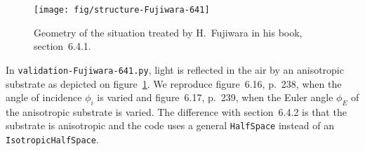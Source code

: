 \begin{figure}[b]
\texttt{[image: fig/structure-Fujiwara-641]}
\caption{\label{fig:situation641}Geometry of the situation treated by H.~Fujiwara in his book, section~6.4.1.}
\end{figure}

In \verb/validation-Fujiwara-641.py/, light is reflected in the air by an anisotropic substrate as depicted on figure~\ref{fig:situation641}.
We reproduce figure~6.16, p.~238, when the angle of incidence $\phi_i$ is varied and figure~6.17, p.~239, when the Euler angle $\phi_E$ of the anisotropic substrate is varied.
The difference with section~6.4.2 is that the substrate is anisotropic and the code uses a general \verb/HalfSpace/ instead of an \verb/IsotropicHalfSpace/.



